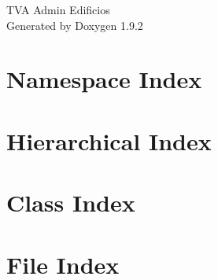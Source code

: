 \documentclass[twoside]{book}
\newcommand{\+}{\discretionary{\mbox{\scriptsize$\hookleftarrow$}}{}{}}
\newcommand{\clearemptydoublepage}{%
    \newpage{\pagestyle{empty}\cleardoublepage}%
  }
\begin{document}
  \raggedbottom
    \hypersetup{pageanchor=false,
                bookmarksnumbered=true,
                pdfencoding=unicode
               }
  \begin{titlepage}
  \vspace*{7cm}
  \begin{center}%
  {\Large TVA Admin Edificios}\\
  \vspace*{1cm}
  {\large Generated by Doxygen 1.9.2}\\
  \end{center}
  \end{titlepage}
  \clearemptydoublepage
  \tableofcontents
  \clearemptydoublepage
  \hypersetup{pageanchor=true}
\chapter{Namespace Index}

\chapter{Hierarchical Index}

\chapter{Class Index}

\chapter{File Index}

\end{document}
